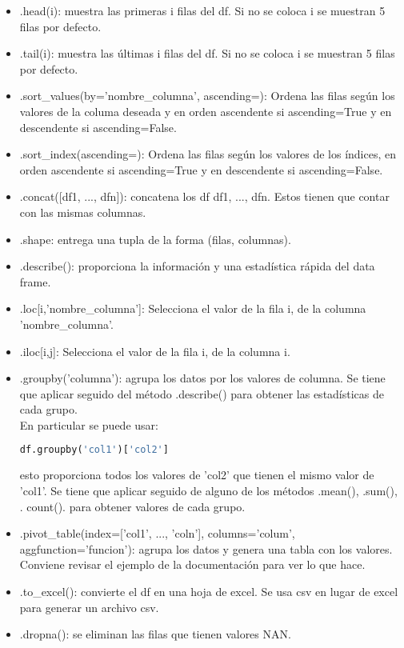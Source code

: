 \documentclass[10pt,oneside]{article}
\begin{document}
\begin{multicols}{2}
                \begin{itemize}
                    \item .head(i): muestra las primeras i filas del df. Si no se coloca i se muestran 5 filas por defecto.
                    \item .tail(i): muestra las últimas i filas del df. Si no se coloca i se muestran 5 filas por defecto.
                    \item .sort\_values(by='nombre\_columna', ascending=): Ordena las filas según los valores de la columa deseada y en orden ascendente si ascending=True y en descendente si ascending=False.
                    \item .sort\_index(ascending=): Ordena las filas según los valores de los índices, en orden ascendente si ascending=True y en descendente si ascending=False.
                    \item .concat([df1, ..., dfn]): concatena los df df1, ...,  dfn. Estos tienen que contar con las mismas columnas. 
                    \item .shape: entrega una tupla de la forma (filas, columnas).
                    \item .describe(): proporciona la información y una estadística rápida del data frame. 
                    \item .loc[i,'nombre\_columna']: Selecciona el valor de la fila i, de la columna 'nombre\_columna'.
                    \item .iloc[i,j]: Selecciona el valor de la fila i, de la columna i.
                    \item .groupby('columna'): agrupa los datos por los valores de columna. Se tiene que aplicar seguido del  método .describe() para obtener las estadísticas de cada grupo. \\ \newline En particular se puede usar: 

                    \begin{lstlisting}[language=Python]
df.groupby('col1')['col2']                        
                    \end{lstlisting}

                    esto proporciona todos los valores de 'col2' que tienen el mismo valor de 'col1'. Se tiene que aplicar seguido de alguno de los métodos .mean(), .sum(), . count(). para obtener valores de cada grupo.
                    \item .pivot\_table(index=['col1', ..., 'coln'], columns='colum', aggfunction='funcion'): agrupa los datos y genera una tabla con los valores. Conviene revisar el ejemplo de la documentación para ver lo que hace.
                    \item .to\_excel(): convierte el df en una hoja de excel. Se usa csv en lugar de excel para generar un archivo csv.
                    \item .dropna(): se eliminan las filas que tienen valores NAN.
                    \end{itemize}
                

\end{multicols}
\end{document}
